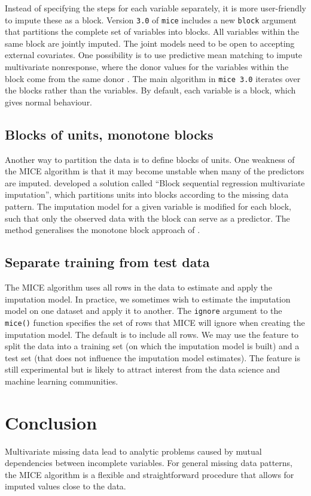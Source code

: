 \documentclass[
]{book}
\begin{document}
Instead of specifying the steps for each variable separately, it is more user-friendly to impute these as a block. Version \texttt{3.0} of \texttt{mice} includes a new \texttt{block} argument that partitions the complete set of variables into blocks. All variables within the same block are jointly imputed. The joint models need to be open to accepting external covariates. One possibility is to use predictive mean matching to impute multivariate nonresponse, where the donor values for the variables within the block come from the same donor \citep{LITTLE1988}. The main algorithm in \texttt{mice\ 3.0} iterates over the blocks rather than the variables. By default, each variable is a block, which gives normal behaviour.

\hypertarget{sec:blockunit}{%
\subsection{Blocks of units, monotone blocks}\label{sec:blockunit}}

Another way to partition the data is to define blocks of units. One weakness of the MICE algorithm is that it may become unstable when many of the predictors are imputed. \citet{ZHU2016} developed a solution called ``Block sequential regression multivariate imputation'', which partitions units into blocks according to the missing data pattern. The imputation model for a given variable is modified for each block, such that only the observed data with the block can serve as a predictor. The method generalises the monotone block approach of \citet{LI2014}.

\hypertarget{separate-training-from-test-data}{%
\subsection{Separate training from test data}\label{separate-training-from-test-data}}

The MICE algorithm uses all rows in the data to estimate and apply the imputation model. In practice, we sometimes wish to estimate the imputation model on one dataset and apply it to another. The \texttt{ignore} argument to the \texttt{mice()} function specifies the set of rows that MICE will ignore when creating the imputation model. The default is to include all rows. We may use the feature to split the data into a training set (on which the imputation model is built) and a test set (that does not influence the imputation model estimates). The feature is still experimental but is likely to attract interest from the data science and machine learning communities.

\hypertarget{conclusion}{%
\section{Conclusion}\label{conclusion}}

Multivariate missing data lead to analytic problems caused by mutual dependencies between incomplete variables. For general missing data patterns, the MICE algorithm is a flexible and straightforward procedure that allows for imputed values close to the data.

  
\end{document}
